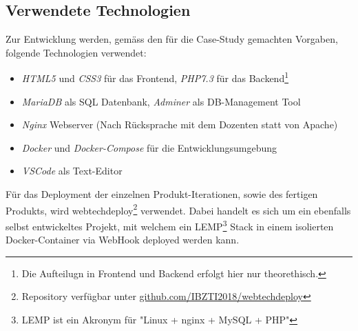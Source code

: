 \subsection{Verwendete Technologien}

Zur Entwicklung werden, gemäss den für die Case-Study gemachten Vorgaben, folgende Technologien verwendet:

\begin{itemize}
  \item \emph{HTML5} und \emph{CSS3} für das Frontend, \emph{PHP7.3} für das Backend\footnote{Die Aufteilugn in Frontend und Backend erfolgt hier nur theorethisch.}
  \item \emph{MariaDB} als SQL Datenbank, \emph{Adminer} als DB-Management Tool
  \item \emph{Nginx} Webserver (Nach Rücksprache mit dem Dozenten statt von Apache)
  \item \emph{Docker} und \emph{Docker-Compose} für die Entwicklungsumgebung
  \item \emph{VSCode} als Text-Editor
\end{itemize}

\noindent
Für das Deployment der einzelnen Produkt-Iterationen, sowie des fertigen Produkts, wird webtechdeploy\footnote{Repository verfügbar unter \href{https://github.com/IBZTI2018/webtechdeploy}{github.com/IBZTI2018/webtechdeploy}} verwendet.
Dabei handelt es sich um ein ebenfalls selbst entwickeltes Projekt, mit welchem ein LEMP\footnote{LEMP ist ein Akronym für "Linux + nginx + MySQL + PHP"} Stack in einem isolierten Docker-Container via WebHook deployed werden kann.
